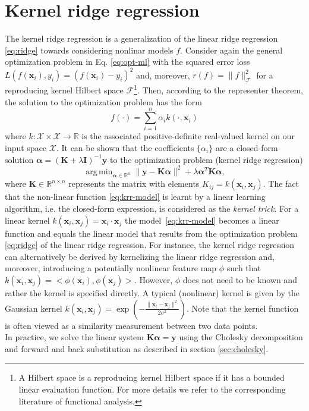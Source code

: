 \documentclass[11pt, a4paper, parskip=half*, bibliography=totoc, cleardoublepage=empty, final,
numbers=noenddot]{scrbook}
\DeclareMathOperator*{\argmin}{arg\,min}
\begin{document}
\section{Kernel ridge regression} \label{sec:krr}
The kernel ridge regression is a generalization of the linear ridge regression \ref{eq:ridge} towards considering nonlinar models $f$. Consider again the general optimization problem in Eq. \ref{eq:opt-ml} with the squared error loss $ L(f(\bm{x}_i),  y_i) = (f(\bm{x}_i)- y_i)^2$ and, moreover, $r(f) = \| f \|^2_\mathcal{F}$ for a reproducing kernel Hilbert space $\mathcal{F}$\footnote{A Hilbert space is a reproducing kernel Hilbert space if it has a bounded linear evaluation function. For more details we refer to the corresponding literature of functional analysis.}. Then, according to the representer theorem, the solution to the optimization problem has the form
\begin{equation}
f(\cdot) = \sum_{i=1}^n \alpha_i k(\cdot, \bm{x}_i)
\label{eq:krr-model} 
\end{equation}
where $k: \mathcal{X} \times \mathcal{X} \rightarrow \mathbb{R}$ is the associated positive-definite real-valued kernel on our input space $\mathcal{X}$. It can be shown that the coefficients $\{ \alpha_i \}$ are a closed-form solution $\bm{\alpha} = (\bm{K}+\lambda \bm{I})^{-1} \bm{y}$ to the optimization problem (kernel ridge regression)
\begin{equation}
\argmin_{\bm{\alpha} \in \mathbb{R}^n} \| \bm{y} - \bm{K} \bm{\alpha} \|^2+ \lambda  \bm{\alpha}^T \bm{K} \bm{\alpha},
\label{eq:kernel-ridge}
\end{equation}
where $\bm{K} \in \mathbb{R}^{n \times n}$ represents the matrix with elements $K_{ij} = k(\bm{x}_i, \bm{x}_j)$. The fact that the non-linear function \ref{eq:krr-model} is learnt by a linear learning algorithm, i.e. the closed-form expression, is considered as the \textit{kernel trick}. For a linear kernel $k(\bm{x}_i, \bm{x}_j) = \bm{x}_i \cdot  \bm{x}_j$ the \mbox{model \ref{eq:krr-model}} becomes a linear function and equals the linear model that results from the optimization problem \ref{eq:ridge} of the linear ridge regression. For instance, the kernel ridge regression can alternatively be derived by kernelizing the linear ridge regression and, moreover, introducing a potentially nonlinear feature map $\phi$ such that $k(\bm{x}_i, \bm{x}_j) = < \phi(\bm{x}_i),   \phi(\bm{x}_j)>$. However, $\phi$ does not need to be known and rather the kernel is specified directly. A typical (nonlinear) kernel is given by the Gaussian kernel $k(\bm{x}_i, \bm{x}_j) = \exp(- \frac{\|\bm{x}_i -  \bm{x}_j\|^2}{2 \sigma^2})$. Note that the kernel function is often viewed as a similarity measurement between two data points.\\
In practice, we solve the linear system $\bm{K} \bm{\alpha}=\bm{y}$ using the Cholesky decomposition and forward and back substitution as described in section \ref{sec:cholesky}.
\end{document}
